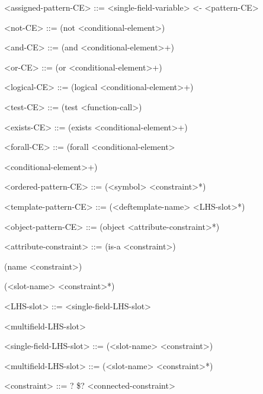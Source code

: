 \documentclass[letterpaper,10pt,english]{sphinxmanual}
\begin{document}
\textless{}assigned-pattern-CE\textgreater{} ::= \textless{}single-field-variable\textgreater{} \textless{}- \textless{}pattern-CE\textgreater{}

\textless{}not-CE\textgreater{} ::= (not \textless{}conditional-element\textgreater{})

\textless{}and-CE\textgreater{} ::= (and \textless{}conditional-element\textgreater{}+)

\textless{}or-CE\textgreater{} ::= (or \textless{}conditional-element\textgreater{}+)

\textless{}logical-CE\textgreater{} ::= (logical \textless{}conditional-element\textgreater{}+)

\textless{}test-CE\textgreater{} ::= (test \textless{}function-call\textgreater{})

\textless{}exists-CE\textgreater{} ::= (exists \textless{}conditional-element\textgreater{}+)

\textless{}forall-CE\textgreater{} ::= (forall \textless{}conditional-element\textgreater{}

\textless{}conditional-element\textgreater{}+)

\textless{}ordered-pattern-CE\textgreater{} ::= (\textless{}symbol\textgreater{} \textless{}constraint\textgreater{}*)

\textless{}template-pattern-CE\textgreater{} ::= (\textless{}deftemplate-name\textgreater{} \textless{}LHS-slot\textgreater{}*)

\textless{}object-pattern-CE\textgreater{} ::= (object \textless{}attribute-constraint\textgreater{}*)

\textless{}attribute-constraint\textgreater{} ::= (is-a \textless{}constraint\textgreater{}) \textbar{}

(name \textless{}constraint\textgreater{}) \textbar{}

(\textless{}slot-name\textgreater{} \textless{}constraint\textgreater{}*)

\textless{}LHS-slot\textgreater{} ::= \textless{}single-field-LHS-slot\textgreater{} \textbar{}

\textless{}multifield-LHS-slot\textgreater{}

\textless{}single-field-LHS-slot\textgreater{} ::= (\textless{}slot-name\textgreater{} \textless{}constraint\textgreater{})

\textless{}multifield-LHS-slot\textgreater{} ::= (\textless{}slot-name\textgreater{} \textless{}constraint\textgreater{}*)

\textless{}constraint\textgreater{} ::= ? \textbar{} \$? \textbar{} \textless{}connected-constraint\textgreater{}
\end{document}

